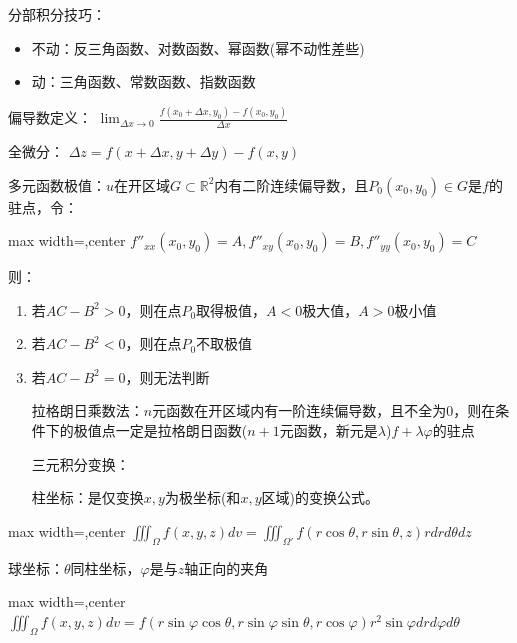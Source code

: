 \documentclass[twocolumn,10pt]{ctexart}
\newcommand{\R}{\mathbb{R}}
\begin{document}
\begin{notebox}
分部积分技巧：

\begin{itemize}
\item 不动：反三角函数、对数函数、幂函数(幂不动性差些)
\item 动：三角函数、常数函数、指数函数
\end{itemize}
\end{notebox}

偏导数定义： $\lim_{\Delta x\to0}\frac{f(x_0+\Delta x,\allowbreak{}y_0)-f(x_0,\allowbreak{}y_0)}{\Delta x}$

全微分： $\Delta z=f(x+\Delta x,\allowbreak{}y+\Delta y)-f(x,\allowbreak{}y)$

多元函数极值：$u$在开区域$G\subset\R^2$内有二阶连续偏导数，且$P_0(x_0,y_0)\in G$是$f$的驻点，令：

\begin{adjustbox}{max width=\linewidth,center}
$f''_{xx}(x_0,y_0)=A,f''_{xy}(x_0,y_0)=B,f''_{yy}(x_0,y_0)=C$
\end{adjustbox}

则：

\begin{enumerate}
\item 若$AC-B^2>0$，则在点$P_0$取得极值，$A<0$极大值，$A>0$极小值
\item 若$AC-B^2<0$，则在点$P_0$不取极值
\item 若$AC-B^2=0$，则无法判断

拉格朗日乘数法：$n$元函数在开区域内有一阶连续偏导数，且不全为$0$，则在条件下的极值点一定是拉格朗日函数($n+1$元函数，新元是$\lambda$)$f+\lambda\varphi$的驻点

三元积分变换：

柱坐标：是仅变换$x,y$为极坐标(和$x,y$区域)的变换公式。
\end{enumerate}

\begin{adjustbox}{max width=\linewidth,center}
$\iiint_\Omega f(x,y,z)dv=\iiint_{\Omega'}f(r\cos\theta,r\sin\theta,z)rdrd\theta dz$
\end{adjustbox}

球坐标：$\theta$同柱坐标，$\varphi$是与$z$轴正向的夹角

\begin{adjustbox}{max width=\linewidth,center}
$\iiint_\Omega f(x,y,z)dv=f(r\sin\varphi\cos\theta,r\sin\varphi\sin\theta,r\cos\varphi)r^2\sin\varphi drd\varphi d\theta$
\end{adjustbox}
\end{document}
